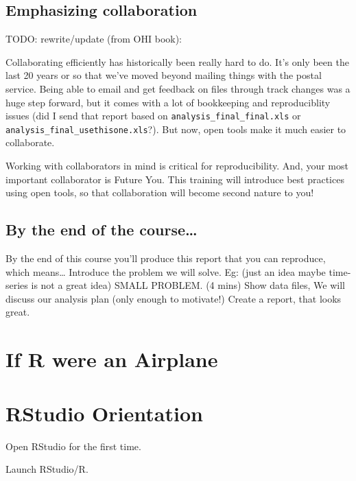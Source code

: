 \documentclass[]{book}
\begin{document}
\hypertarget{emphasizing-collaboration}{%
\subsection{Emphasizing collaboration}\label{emphasizing-collaboration}}

TODO: rewrite/update (from OHI book):

Collaborating efficiently has historically been really hard to do. It's only been the last 20 years or so that we've moved beyond mailing things with the postal service. Being able to email and get feedback on files through track changes was a huge step forward, but it comes with a lot of bookkeeping and reproduciblity issues (did I send that report based on \texttt{analysis\_final\_final.xls} or \texttt{analysis\_final\_usethisone.xls}?). But now, open tools make it much easier to collaborate.

Working with collaborators in mind is critical for reproducibility. And, your most important collaborator is Future You. This training will introduce best practices using open tools, so that collaboration will become second nature to you!

\hypertarget{by-the-end-of-the-course}{%
\subsection{By the end of the course\ldots{}}\label{by-the-end-of-the-course}}

By the end of this course you'll produce this report that you can reproduce, which means\ldots{}
Introduce the problem we will solve. Eg: (just an idea maybe time-series is not a great idea) SMALL PROBLEM. (4 mins)
Show data files, We will discuss our analysis plan (only enough to motivate!) Create a report, that looks great.

\hypertarget{if-r-were-an-airplane}{%
\section{If R were an Airplane}\label{if-r-were-an-airplane}}

\hypertarget{rstudio-orientation}{%
\section{RStudio Orientation}\label{rstudio-orientation}}

Open RStudio for the first time.

Launch RStudio/R.
\end{document}
